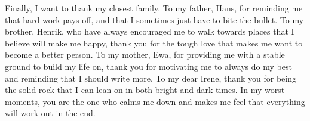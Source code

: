 \noindent Finally, I want to thank my closest family. To my father, Hans, for reminding me that hard work pays off, and that I sometimes just have to bite the bullet. To my brother, Henrik, who have always encouraged me to walk towards places that I believe will make me happy, thank you for the tough love that makes me want to become a better person. To my mother, Ewa, for providing me with a stable ground to build my life on, thank you for motivating me to always do my best and reminding that I should write more. To my dear Irene, thank you for being the solid rock that I can lean on in both bright and dark times. In my worst moments, you are the one who calms me down and makes me feel that everything will work out in the end.
\newline    





